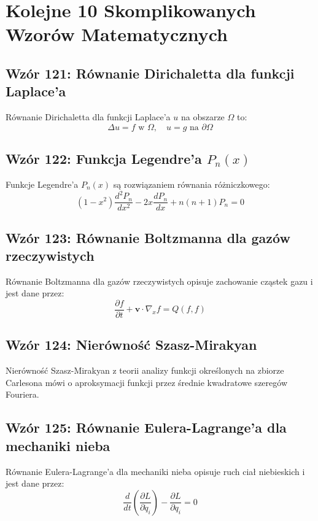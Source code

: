 \documentclass{article}
\begin{document}
\section*{Kolejne 10 Skomplikowanych Wzorów Matematycznych}

\subsection*{Wzór 121: Równanie Dirichaletta dla funkcji Laplace'a}

Równanie Dirichaletta dla funkcji Laplace'a \(u\) na obszarze \(\Omega\) to:
\[ \Delta u = f \text{ w } \Omega, \quad u = g \text{ na } \partial \Omega \]

\subsection*{Wzór 122: Funkcja Legendre'a \(P_n(x)\)}

Funkcje Legendre'a \(P_n(x)\) są rozwiązaniem równania różniczkowego:
\[ (1-x^2) \frac{d^2P_n}{dx^2} - 2x \frac{dP_n}{dx} + n(n+1)P_n = 0 \]

\subsection*{Wzór 123: Równanie Boltzmanna dla gazów rzeczywistych}

Równanie Boltzmanna dla gazów rzeczywistych opisuje zachowanie cząstek gazu i jest dane przez:
\[ \frac{\partial f}{\partial t} + \mathbf{v} \cdot \nabla_x f = Q(f, f) \]

\subsection*{Wzór 124: Nierówność Szasz-Mirakyan}

Nierówność Szasz-Mirakyan z teorii analizy funkcji określonych na zbiorze Carlesona mówi o aproksymacji funkcji przez średnie kwadratowe szeregów Fouriera.

\subsection*{Wzór 125: Równanie Eulera-Lagrange'a dla mechaniki nieba}

Równanie Eulera-Lagrange'a dla mechaniki nieba opisuje ruch ciał niebieskich i jest dane przez:
\[ \frac{d}{dt}\left(\frac{\partial L}{\partial \dot{q}_i}\right) - \frac{\partial L}{\partial q_i} = 0 \]
\end{document}

